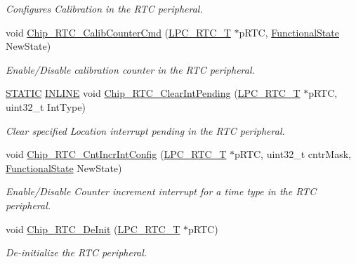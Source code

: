 \begin{DoxyCompactItemize}
\begin{DoxyCompactList}\small\item\em Configures Calibration in the R\+TC peripheral. \end{DoxyCompactList}\item 
void \hyperlink{group__RTC__17XX__40XX_ga987c9ab06dc2bb157388ddf9159de813}{Chip\+\_\+\+R\+T\+C\+\_\+\+Calib\+Counter\+Cmd} (\hyperlink{structLPC__RTC__T}{L\+P\+C\+\_\+\+R\+T\+C\+\_\+T} $\ast$p\+R\+TC, \hyperlink{group__LPC__Types__Public__Types_gac9a7e9a35d2513ec15c3b537aaa4fba1}{Functional\+State} New\+State)
\begin{DoxyCompactList}\small\item\em Enable/\+Disable calibration counter in the R\+TC peripheral. \end{DoxyCompactList}\item 
\hyperlink{group__LPC__Types__Public__Macros_ga10b2d890d871e1489bb02b7e70d9bdfb}{S\+T\+A\+T\+IC} \hyperlink{group__LPC__Types__Public__Types_ga2eb6f9e0395b47b8d5e3eeae4fe0c116}{I\+N\+L\+I\+NE} void \hyperlink{group__RTC__17XX__40XX_gaa43865e87cf61d579a4ee52a307b3e30}{Chip\+\_\+\+R\+T\+C\+\_\+\+Clear\+Int\+Pending} (\hyperlink{structLPC__RTC__T}{L\+P\+C\+\_\+\+R\+T\+C\+\_\+T} $\ast$p\+R\+TC, uint32\+\_\+t Int\+Type)
\begin{DoxyCompactList}\small\item\em Clear specified Location interrupt pending in the R\+TC peripheral. \end{DoxyCompactList}\item 
void \hyperlink{group__RTC__17XX__40XX_gaddaf7559a23df0704358128234fcb214}{Chip\+\_\+\+R\+T\+C\+\_\+\+Cnt\+Incr\+Int\+Config} (\hyperlink{structLPC__RTC__T}{L\+P\+C\+\_\+\+R\+T\+C\+\_\+T} $\ast$p\+R\+TC, uint32\+\_\+t cntr\+Mask, \hyperlink{group__LPC__Types__Public__Types_gac9a7e9a35d2513ec15c3b537aaa4fba1}{Functional\+State} New\+State)
\begin{DoxyCompactList}\small\item\em Enable/\+Disable Counter increment interrupt for a time type in the R\+TC peripheral. \end{DoxyCompactList}\item 
void \hyperlink{group__RTC__17XX__40XX_ga63cc16f1c4b72523e0e67a6c651f0026}{Chip\+\_\+\+R\+T\+C\+\_\+\+De\+Init} (\hyperlink{structLPC__RTC__T}{L\+P\+C\+\_\+\+R\+T\+C\+\_\+T} $\ast$p\+R\+TC)
\begin{DoxyCompactList}\small\item\em De-\/initialize the R\+TC peripheral. \end{DoxyCompactList}\item 

\end{DoxyCompactItemize}
